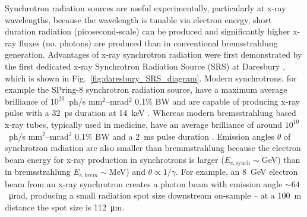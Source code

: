 \documentclass[../main.tex]{subfiles}
\begin{document}
Synchrotron radiation sources are useful experimentally, particularly at x-ray wavelengths, because the wavelength is tunable via electron energy, short duration radiation (picosecond-scale) can be produced and significantly higher x-ray fluxes (no. photons) are produced than in conventional bremsstrahlung generation. Advantages of x-ray synchrotron radiation were first demonstrated by the first dedicated x-ray Synchrotron Radiation Source (SRS) at Daresbury \cite{munro2019fifty,robinson1981experiments}, which is shown in Fig.~\ref{fig:daresbury_SRS_diagram}. Modern synchrotrons, for example the SPring-8 synchrotron radiation source, have a maximum average brilliance of $10^{20}$~ph/\si{\second} \si{\milli\meter}$^{2}$--\si{\milli\radian}$^{2}$ 0.1\% BW \cite{spring8beamlines} and are capable of producing x-ray pulse with a 32~\si{\pico\second} duration at 14~\si{\kilo\electronvolt} \cite{tanaka2001field}. Whereas modern bremsstrahlung based x-ray tubes, typically used in medicine, have an average brilliance of around $10^{10}$~ph/\si{\second} \si{\milli\meter}$^{2}$--\si{\milli\radian}$^{2}$ 0.1\% BW and a 2~\si{\milli\second} pulse duration \cite{behling2018diagnostic}.
Emission angles $\theta$ of synchrotron radiation are also smaller than bremmstrahlung because the electron beam energy for x-ray production in synchrotrons is larger ($E_{e,\mathrm{synch}}\sim$\si{\giga\electronvolt}) than in bremsstrahlung $E_{e,\si{brem}}\sim$\si{\mega\electronvolt}) and $\theta \propto 1/\gamma$. For example, an 8~\si{\giga\electronvolt} electron beam from an x-ray synchrotron creates a photon beam with emission angle $\sim 64$~\si{\micro\radian}, producing a small radiation spot size downstream on-sample -- at a 100~\si{\meter} distance the spot size is 112~\si{\micro\meter}.        
\end{document}
